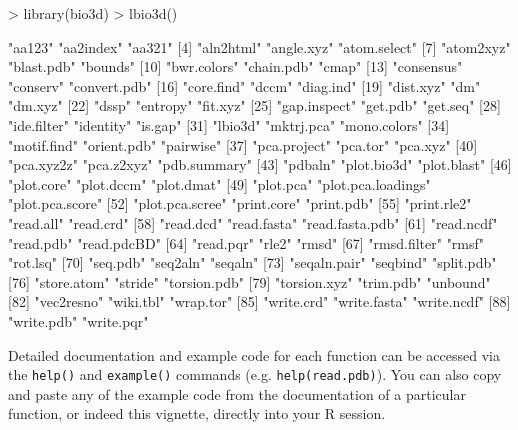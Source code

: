 \documentclass[letter]{article}
\begin{document}
\begin{Schunk}
\begin{Sinput}
> library(bio3d)
> lbio3d()
\end{Sinput}
\begin{Soutput}
 [1] "aa123"             "aa2index"          "aa321"            
 [4] "aln2html"          "angle.xyz"         "atom.select"      
 [7] "atom2xyz"          "blast.pdb"         "bounds"           
[10] "bwr.colors"        "chain.pdb"         "cmap"             
[13] "consensus"         "conserv"           "convert.pdb"      
[16] "core.find"         "dccm"              "diag.ind"         
[19] "dist.xyz"          "dm"                "dm.xyz"           
[22] "dssp"              "entropy"           "fit.xyz"          
[25] "gap.inspect"       "get.pdb"           "get.seq"          
[28] "ide.filter"        "identity"          "is.gap"           
[31] "lbio3d"            "mktrj.pca"         "mono.colors"      
[34] "motif.find"        "orient.pdb"        "pairwise"         
[37] "pca.project"       "pca.tor"           "pca.xyz"          
[40] "pca.xyz2z"         "pca.z2xyz"         "pdb.summary"      
[43] "pdbaln"            "plot.bio3d"        "plot.blast"       
[46] "plot.core"         "plot.dccm"         "plot.dmat"        
[49] "plot.pca"          "plot.pca.loadings" "plot.pca.score"   
[52] "plot.pca.scree"    "print.core"        "print.pdb"        
[55] "print.rle2"        "read.all"          "read.crd"         
[58] "read.dcd"          "read.fasta"        "read.fasta.pdb"   
[61] "read.ncdf"         "read.pdb"          "read.pdcBD"       
[64] "read.pqr"          "rle2"              "rmsd"             
[67] "rmsd.filter"       "rmsf"              "rot.lsq"          
[70] "seq.pdb"           "seq2aln"           "seqaln"           
[73] "seqaln.pair"       "seqbind"           "split.pdb"        
[76] "store.atom"        "stride"            "torsion.pdb"      
[79] "torsion.xyz"       "trim.pdb"          "unbound"          
[82] "vec2resno"         "wiki.tbl"          "wrap.tor"         
[85] "write.crd"         "write.fasta"       "write.ncdf"       
[88] "write.pdb"         "write.pqr"        
\end{Soutput}
\end{Schunk}
Detailed documentation and example code for each function can be accessed via the \texttt{help()} and \texttt{example()} commands (e.g. \texttt{help(read.pdb)}).  You can also copy and paste any of the example code from the documentation of a particular function, or indeed this vignette, directly into your R session.
\end{document}
